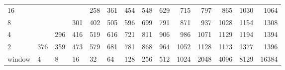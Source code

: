 \begin{table}[h]
{\begin{tabular}{lrrrrrrrrrrrrr}
			\multicolumn{1}{|l|}{16} &  &  &  & \cellcolor[HTML]{99E600}258 & \cellcolor[HTML]{99E600}361 & \cellcolor[HTML]{E69900}454 & \cellcolor[HTML]{E69900}548 & \cellcolor[HTML]{E69900}629 & \cellcolor[HTML]{E60000}715 & \cellcolor[HTML]{E60000}797 & \cellcolor[HTML]{E60000}865 & \cellcolor[HTML]{9900E6}1030 & \cellcolor[HTML]{9900E6}1064 \\ \cline{1-1}
			\multicolumn{1}{|l|}{8} &  &  & \cellcolor[HTML]{99E600}301 & \cellcolor[HTML]{99E600}402 & \cellcolor[HTML]{E69900}505 & \cellcolor[HTML]{E69900}596 & \cellcolor[HTML]{E60000}699 & \cellcolor[HTML]{E60000}791 & \cellcolor[HTML]{E60000}871 & \cellcolor[HTML]{9900E6}937 & \cellcolor[HTML]{9900E6}1028 & \cellcolor[HTML]{4C00E6}1154 & \cellcolor[HTML]{4C00E6}1308 \\ \cline{1-1}
			\multicolumn{1}{|l|}{4} &  & \cellcolor[HTML]{99E600}296 & \cellcolor[HTML]{99E600}416 & \cellcolor[HTML]{E69900}519 & \cellcolor[HTML]{E69900}616 & \cellcolor[HTML]{E60000}721 & \cellcolor[HTML]{E60000}811 & \cellcolor[HTML]{E60000}906 & \cellcolor[HTML]{9900E6}986 & \cellcolor[HTML]{9900E6}1071 & \cellcolor[HTML]{9900E6}1129 & \cellcolor[HTML]{4C00E6}1194 & \cellcolor[HTML]{4C00E6}1394 \\ \cline{1-1}
			\multicolumn{1}{|l|}{2} & \cellcolor[HTML]{99E600}376 & \cellcolor[HTML]{99E600}359 & \cellcolor[HTML]{E69900}473 & \cellcolor[HTML]{E69900}579 & \cellcolor[HTML]{E60000}681 & \cellcolor[HTML]{E60000}781 & \cellcolor[HTML]{E60000}868 & \cellcolor[HTML]{9900E6}964 & \cellcolor[HTML]{9900E6}1052 & \cellcolor[HTML]{9900E6}1128 & \cellcolor[HTML]{4C00E6}1173 & \cellcolor[HTML]{4C00E6}1377 & \cellcolor[HTML]{4C00E6}1396 \\ \cline{1-1}
			\multicolumn{1}{l|}{window} & \multicolumn{1}{l|}{4} & \multicolumn{1}{l|}{8} & \multicolumn{1}{l|}{16} & \multicolumn{1}{l|}{32} & \multicolumn{1}{l|}{64} & \multicolumn{1}{l|}{128} & \multicolumn{1}{l|}{256} & \multicolumn{1}{l|}{512} & \multicolumn{1}{l|}{1024} & \multicolumn{1}{l|}{2048} & \multicolumn{1}{l|}{4096} & \multicolumn{1}{l|}{8129} & \multicolumn{1}{l|}{16384} \\ \cline{2-14}
		\end{tabular}
	}
\end{table}

